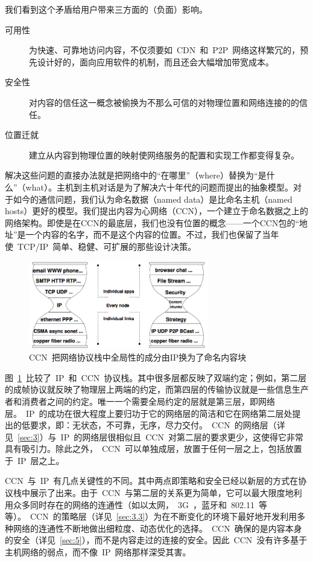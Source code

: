 我们看到这个矛盾给用户带来三方面的（负面）影响。

\begin{description}
\item[可用性]为快速、可靠地访问内容，不仅须要如~CDN~和~P2P~网络这样繁冗的，预先设计好的，面向应用软件的机制，而且还会大幅增加带宽成本。
\item[安全性]对内容的信任这一概念被偷换为不那么可信的对物理位置和网络连接的的信任。
\item[位置迁就]建立从内容到物理位置的映射使网络服务的配置和实现工作都变得复杂。
\end{description}

解决这些问题的直接办法就是把网络中的“在哪里”（where）替换为“是什么”（what）。主机到主机对话是为了解决六十年代的问题而提出的抽象模型。对于如今的通信问题，我们认为命名数据（named data）是比命名主机（named hosts）更好的模型。我们提出内容为心网络（CCN），一个建立于命名数据之上的网络架构。即使是在CCN的最底层，我们也没有位置的概念——一个CCN包的“地址”是一个内容的名字，而不是这个内容的位置。不过，我们也保留了当年使~TCP/IP~简单、稳健、可扩展的那些设计决策。

\begin{figure}[htbp]
  \centering
  \includegraphics[width=0.7\textwidth]{images/narrow_waist}
  \caption{CCN~把网络协议栈中全局性的成分由IP换为了命名内容块} %
  \label{narrow_waist}
\end{figure}

图~\ref{narrow_waist}~比较了~IP~和~CCN~协议栈。其中很多层都反映了双端约定；例如，第二层的成帧协议就反映了物理层上两端的约定，而第四层的传输协议就是一些信息生产者和消费者之间的约定。唯一一个需要全局约定的层就是第三层，即网络层。~IP~的成功在很大程度上要归功于它的网络层的简洁和它在网络第二层处提出的低要求，即：无状态，不可靠，无序，尽力交付。~CCN~的网络层（详见~\ref{sec:3}）与~IP~的网络层很相似且~CCN~对第二层的要求更少，这使得它非常具有吸引力。除此之外，~CCN~可以单独成层，放置于任何一层之上，包括放置于~IP~层之上。%

CCN~与~IP~有几点关键性的不同。其中两点即策略和安全已经以新层的方式在协议栈中展示了出来。由于~CCN~与第二层的关系更为简单，它可以最大限度地利用众多同时存在的网络的连通性（如以太网，~3G~，蓝牙和~802.11~等等）。~CCN~的策略层（详见~\ref{sec:3.3}）为在不断变化的环境下最好地开发利用多种网络的连通性不断地做出细粒度、动态优化的选择。~CCN~确保的是内容本身的安全（详见~\ref{sec:5}），而不是内容走过的连接的安全。因此~CCN~没有许多基于主机网络的弱点，而不像~IP~网络那样深受其害。


